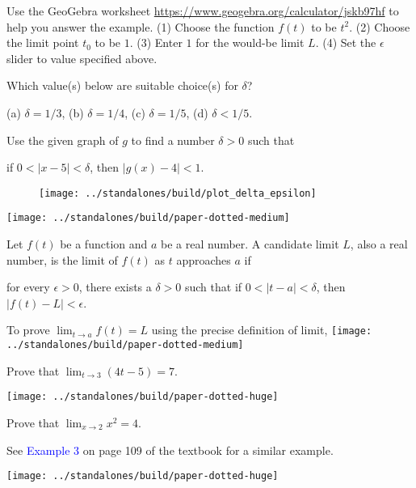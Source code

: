 \documentclass[../main.tex]{subfiles}
\begin{document}
\begin{example}
  Use the GeoGebra worksheet \url{https://www.geogebra.org/calculator/jskb97hf} to help you answer the example. (1) Choose the function \(f(t)\) to be \(t^2\). (2) Choose the limit point \(t_{0}\) to be \(1\). (3) Enter \(1\) for the would-be limit \(L\). (4) Set the \(\epsilon\) slider to value specified above.

  Which value(s) below are suitable choice(s) for \(\delta\)?
  \begin{center}
    (a) \(\delta = 1/3\), \hspace{1em}
    (b) \(\delta = 1/4\), \hspace{1em}
    (c) \(\delta = 1/5\), \hspace{1em}
    (d) \(\delta < 1/5\).
  \end{center}
\end{example}
\clearpage

\begin{example}
  Use the given graph of \(g\) to find a number \(\delta > 0\) such that
  \begin{center}
    if \(0 < |x - 5| < \delta\), then \(|g(x) - 4| < 1\).
  \end{center}

  \begin{figure}[h]  %
    \centering
    \texttt{[image: ../standalones/build/plot\_delta\_epsilon]}
    \label{fig:plot_delta_epsilon}
  \end{figure}
\end{example}
\texttt{[image: ../standalones/build/paper-dotted-medium]}

\begin{mdframed}[style=withref]
  Let \(f(t)\) be a function and \(a\) be a real number. A candidate limit \(L\), also a real number, is the limit of \(f(t)\) as \(t\) approaches \(a\) if
  \begin{center}
    for every \(\epsilon > 0\), there exists a \(\delta > 0\) such that if \(0 < |t - a| < \delta\), then \(|f(t) - L| < \epsilon\).
  \end{center}

\end{mdframed}

To {prove} \(\lim_{t \to a} f(t) = L\) using the precise definition of limit,
\texttt{[image: ../standalones/build/paper-dotted-medium]}
\clearpage

\begin{example}
  Prove that \(\lim_{t \to 3} (4t - 5) = 7\). \hfill {}
\end{example}
\texttt{[image: ../standalones/build/paper-dotted-huge]}
\clearpage

\begin{example}
  Prove that \(\lim_{x \to 2} x^{2} = 4\).

    {\footnotesize See \textcolor{blue}{Example 3} on page 109 of the textbook for a similar example.}
\end{example}
\texttt{[image: ../standalones/build/paper-dotted-huge]}
\end{document}
